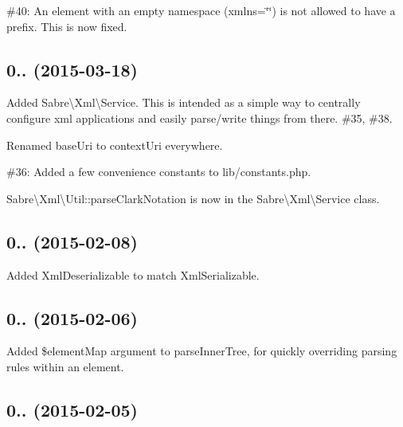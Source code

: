 \begin{DoxyItemize}
\item \#40\+: An element with an empty namespace (xmlns=\char`\"{}\char`\"{}) is not allowed to have a prefix. This is now fixed.
\end{DoxyItemize}

\subsection*{0.. (2015-\/03-\/18) }


\begin{DoxyItemize}
\item Added {\ttfamily Sabre\textbackslash{}Xml\textbackslash{}Service}. This is intended as a simple way to centrally configure xml applications and easily parse/write things from there. \#35, \#38.
\item Renamed \textquotesingle{}base\+Uri\textquotesingle{} to \textquotesingle{}context\+Uri\textquotesingle{} everywhere.
\item \#36\+: Added a few convenience constants to {\ttfamily lib/constants.\+php}.
\item {\ttfamily Sabre\textbackslash{}Xml\textbackslash{}Util\+::parse\+Clark\+Notation} is now in the {\ttfamily Sabre\textbackslash{}Xml\textbackslash{}Service} class.
\end{DoxyItemize}

\subsection*{0.. (2015-\/02-\/08) }


\begin{DoxyItemize}
\item Added {\ttfamily Xml\+Deserializable} to match {\ttfamily Xml\+Serializable}.
\end{DoxyItemize}

\subsection*{0.. (2015-\/02-\/06) }


\begin{DoxyItemize}
\item Added {\ttfamily \$element\+Map} argument to parse\+Inner\+Tree, for quickly overriding parsing rules within an element.
\end{DoxyItemize}

\subsection*{0.. (2015-\/02-\/05) }



